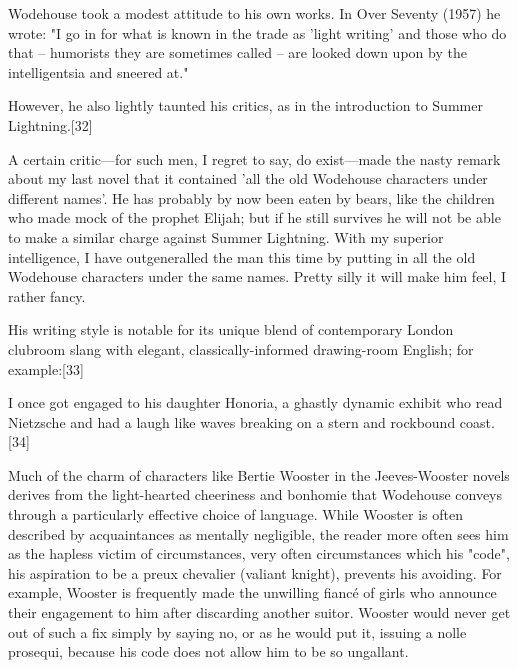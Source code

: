 Wodehouse took a modest attitude to his own works. In Over Seventy
(1957) he wrote: "I go in for what is known in the trade as 'light
writing' and those who do that – humorists they are sometimes called –
are looked down upon by the intelligentsia and sneered at."

However, he also lightly taunted his critics, as in the introduction
to Summer Lightning.[32]

A certain critic—for such men, I regret to say, do exist—made the
nasty remark about my last novel that it contained 'all the old
Wodehouse characters under different names'. He has probably by now
been eaten by bears, like the children who made mock of the prophet
Elijah; but if he still survives he will not be able to make a similar
charge against Summer Lightning. With my superior intelligence, I have
outgeneralled the man this time by putting in all the old Wodehouse
characters under the same names. Pretty silly it will make him feel, I
rather fancy.

His writing style is notable for its unique blend of contemporary
London clubroom slang with elegant, classically-informed drawing-room
English; for example:[33]

I once got engaged to his daughter Honoria, a ghastly dynamic exhibit
who read Nietzsche and had a laugh like waves breaking on a stern and
rockbound coast.[34]

Much of the charm of characters like Bertie Wooster in the
Jeeves-Wooster novels derives from the light-hearted cheeriness and
bonhomie that Wodehouse conveys through a particularly effective
choice of language. While Wooster is often described by acquaintances
as mentally negligible, the reader more often sees him as the hapless
victim of circumstances, very often circumstances which his "code",
his aspiration to be a preux chevalier (valiant knight), prevents his
avoiding. For example, Wooster is frequently made the unwilling fiancé
of girls who announce their engagement to him after discarding another
suitor. Wooster would never get out of such a fix simply by saying no,
or as he would put it, issuing a nolle prosequi, because his code does
not allow him to be so ungallant.


